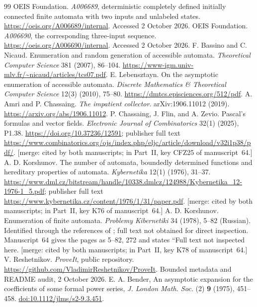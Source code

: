 \documentclass[11pt,letterpaper]{article}
\theoremstyle{remark}\newtheorem{remark}[theorem]{Remark}
\numberwithin{equation}{section}
\begin{document}
\begingroup\small\setlength{\parskip}{0pt}\raggedright
\begin{thebibliography}{99}\setlength{\itemsep}{4pt}
 OEIS Foundation. \emph{A006689}, deterministic completely defined initially connected finite automata with two inputs and unlabeled states. \url{https://oeis.org/A006689/internal}. Accessed 2 October 2026.
 OEIS Foundation. \emph{A006690}, the corresponding three-input sequence. \url{https://oeis.org/A006690/internal}. Accessed 2 October 2026.
 F. Bassino and C. Nicaud. Enumeration and random generation of accessible automata. \emph{Theoretical Computer Science} 381 (2007), 86--104. \url{https://www-igm.univ-mlv.fr/~nicaud/articles/tcs07.pdf}.
 E. Lebensztayn. On the asymptotic enumeration of accessible automata. \emph{Discrete Mathematics \& Theoretical Computer Science} 12(3) (2010), 75--80. \url{https://dmtcs.episciences.org/512/pdf}.
 A. Amri and P. Chassaing. \emph{The impatient collector}. arXiv:1906.11012 (2019). \url{https://arxiv.org/abs/1906.11012}.
 P. Chassaing, J. Flin, and A. Zevio. Pascal's formulas and vector fields. \emph{Electronic Journal of Combinatorics} 32(1) (2025), P1.38. \url{https://doi.org/10.37236/12591}; publisher full text \url{https://www.combinatorics.org/ojs/index.php/eljc/article/download/v32i1p38/pdf/}. [merge: cited by both manuscripts; in Part~II, key CFZ25 of manuscript~64.]
 A. D. Korshunov. The number of automata, boundedly determined functions and hereditary properties of automata. \emph{Kybernetika} 12(1) (1976), 31--37. \url{https://www.dml.cz/bitstream/handle/10338.dmlcz/124988/Kybernetika_12-1976-1_5.pdf}; publisher full text \url{https://www.kybernetika.cz/content/1976/1/31/paper.pdf}. [merge: cited by both manuscripts; in Part~II, key K76 of manuscript~64.]
 A. D. Korshunov. Enumeration of finite automata. \emph{Problemy Kibernetiki} 34 (1978), 5--82 (Russian). Identified through the references of \cite{lebensztayn}; full text not obtained for direct inspection. Manuscript~64 gives the pages as 5--82, 272 and states ``Full text not inspected here. [merge: cited by both manuscripts; in Part~II, key K78 of manuscript~64.]
 V. Reshetnikov. \emph{ProveIt}, public repository. \url{https://github.com/VladimirReshetnikov/ProveIt}. Bounded metadata and README audit, 2 October 2026.
 E. A. Bender, An asymptotic expansion for the coefficients of some formal power series, \emph{J. London Math. Soc.} (2) \textbf{9} (1975), 451--458. \href{https://doi.org/10.1112/jlms/s2-9.3.451}{doi:10.1112/jlms/s2-9.3.451}.

\end{thebibliography}
\end{document}
